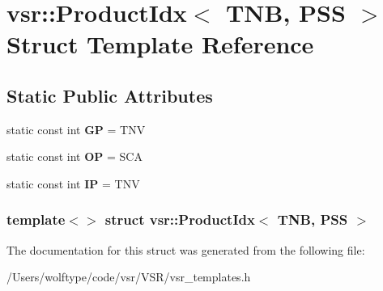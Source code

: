 \hypertarget{structvsr_1_1_product_idx_3_01_t_n_b_00_01_p_s_s_01_4}{\section{vsr\-:\-:Product\-Idx$<$ T\-N\-B, P\-S\-S $>$ Struct Template Reference}
\label{structvsr_1_1_product_idx_3_01_t_n_b_00_01_p_s_s_01_4}
}
\subsection*{Static Public Attributes}
\begin{DoxyCompactItemize}
\item 
\hypertarget{structvsr_1_1_product_idx_3_01_t_n_b_00_01_p_s_s_01_4_a14dd37bb8aa31437e68db639c5b4b0e2}{static const int {\bfseries G\-P} = T\-N\-V}\label{structvsr_1_1_product_idx_3_01_t_n_b_00_01_p_s_s_01_4_a14dd37bb8aa31437e68db639c5b4b0e2}

\item 
\hypertarget{structvsr_1_1_product_idx_3_01_t_n_b_00_01_p_s_s_01_4_a58f60531950c5eb41ea8a22753f698d4}{static const int {\bfseries O\-P} = S\-C\-A}\label{structvsr_1_1_product_idx_3_01_t_n_b_00_01_p_s_s_01_4_a58f60531950c5eb41ea8a22753f698d4}

\item 
\hypertarget{structvsr_1_1_product_idx_3_01_t_n_b_00_01_p_s_s_01_4_a671bd72b1aa910d3945712c0e7706940}{static const int {\bfseries I\-P} = T\-N\-V}\label{structvsr_1_1_product_idx_3_01_t_n_b_00_01_p_s_s_01_4_a671bd72b1aa910d3945712c0e7706940}

\end{DoxyCompactItemize}
\subsubsection*{template$<$$>$ struct vsr\-::\-Product\-Idx$<$ T\-N\-B, P\-S\-S $>$}



The documentation for this struct was generated from the following file\-:\begin{DoxyCompactItemize}
\item 
/\-Users/wolftype/code/vsr/\-V\-S\-R/vsr\-\_\-templates.\-h\end{DoxyCompactItemize}
